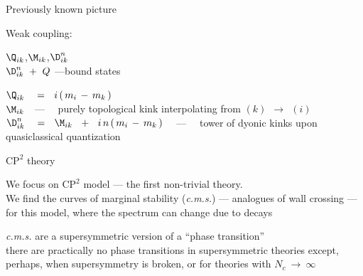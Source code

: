 \documentclass{beamer}
\begin{document}
\begin{frame}{}

	Previously known picture

\begin{block}{Weak coupling:}  

\vspace{2mm}
	\qquad\qquad
	\qquad\qquad
	$ \Q_{ik} $,\quad $ \M_{ik} $,\quad $ \D_{ik}^n $\\[0.5cm]

	\qquad\qquad
	\qquad\qquad
	$ \D_{ik}^n ~+~ Q $ \quad---\quad bound states
\vspace{1mm}
\end{block}

\begin{block}{}
$
	\Q_{ik}  ~~~=~~  i\, (\, m_i \,-\, m_k \,)
$\\[4mm]

$ \M_{ik} $ \,~---~~ purely topological kink interpolating from $(k) ~~\rightarrow~~ (i)$
\\[4mm]

$
	\D_{ik}^n  ~~~=~~ \M_{ik}  ~~+~~ i\, n\, (\, m_i \,-\, m_k \,)
$ 
	~~---~~ tower of dyonic kinks upon\\
\hspace{7cm} quasiclassical quantization
\vspace{1mm}
\end{block}

\end{frame}


\begin{frame}{$\text{CP}^2$ theory}

	We focus on $\text{CP}^2$ model --- the first non-trivial theory.\\[2mm]

	We find the curves of marginal stability ({\it c.m.s.}) --- analogues of wall crossing --- 
	for this model, where the spectrum can change due to decays

	\pause
\begin{block}{}
\vspace{2mm}

	\alert{\it c.m.s.} are a supersymmetric version of a ``phase transition''\\[1mm]
	there are practically no phase transitions in supersymmetric theories
	except, perhaps, when supersymmetry is broken, 
	or for theories with $ N_c ~\to~ \infty $
	
\vspace{2mm}
\end{block}

\end{frame}
\end{document}
